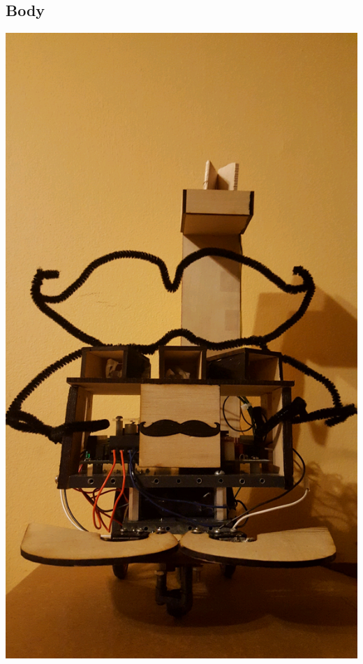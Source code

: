 \documentclass{article}
\begin{document}
\subsection{Body}
\begin{center}
\includegraphics[height=\textheight]{Robot.png}
\end{center}
\end{document}
